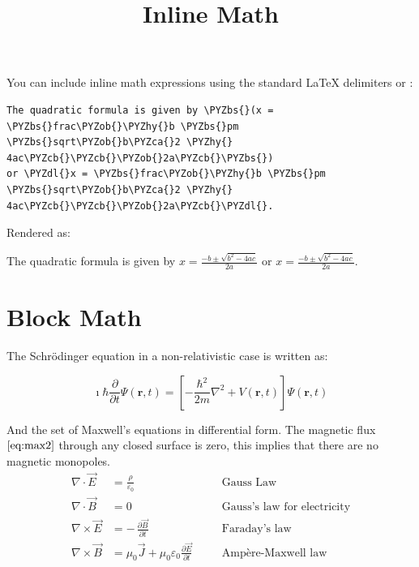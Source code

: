 \documentclass[a4paper,twoside]{article}
\title{Inline Math}
\author{}\date{}
\begin{document}
\maketitle
You can include inline math expressions using the standard \LaTeX{} delimiters  or  :
\begin{tscode}[lang=markdown, engine=pygments]
\begin{Verbatim}[commandchars=\\\{\},breaklines, breakanywhere, commandchars=\\\{\}]
The quadratic formula is given by \PYZbs{}(x = \PYZbs{}frac\PYZob{}\PYZhy{}b \PYZbs{}pm \PYZbs{}sqrt\PYZob{}b\PYZca{}2 \PYZhy{} 4ac\PYZcb{}\PYZcb{}\PYZob{}2a\PYZcb{}\PYZbs{})
or \PYZdl{}x = \PYZbs{}frac\PYZob{}\PYZhy{}b \PYZbs{}pm \PYZbs{}sqrt\PYZob{}b\PYZca{}2 \PYZhy{} 4ac\PYZcb{}\PYZcb{}\PYZob{}2a\PYZcb{}\PYZdl{}.
\end{Verbatim}
\end{tscode}
Rendered as:
\begin{displayquote}
The quadratic formula is given by $x = \frac{-b \pm \sqrt{b^2 - 4ac}}{2a}$
or $x = \frac{-b \pm \sqrt{b^2 - 4ac}}{2a}$.
\end{displayquote}
\section{Block Math}
The Schrödinger equation in a non-relativistic case is written as:

$$
\imath \hbar \frac{\partial}{\partial t} \Psi(\mathbf{r},t) =
\left[ -\frac{\hbar^2}{2m} \nabla^2 + V(\mathbf{r},t) \right] \Psi(\mathbf{r},t)
$$

And the set of Maxwell's equations in differential form. The magnetic flux $\eqref{eq:max2}$ through any closed surface is zero, this implies that there are no magnetic monopoles.
\begin{align}
\nabla \cdot \vec{E} &= \frac{\rho}{\varepsilon_0} \quad &&\text{Gauss Law}\\[4pt]
\nabla \cdot \vec{B} &= 0 \quad &&\text{Gauss's law for electricity} \label{eq:max2}\\[4pt]
\nabla \times \vec{E} &= -\,\frac{\partial \vec{B}}{\partial t}
\quad &&\text{Faraday's law}\\[4pt]
\nabla \times \vec{B} &= \mu_0 \vec{J} + \mu_0 \varepsilon_0
\frac{\partial \vec{E}}{\partial t}
\quad &&\text{Ampère-Maxwell law}
\end{align}
\end{document}
